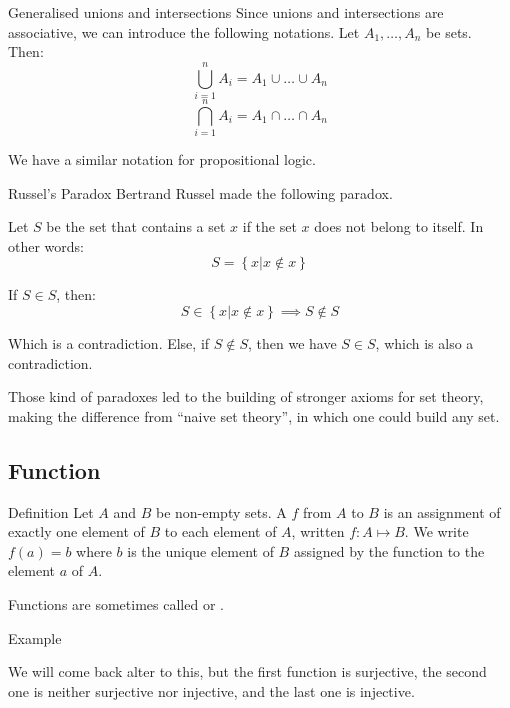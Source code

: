 \documentclass[a4paper]{article}
\begin{document}
\begin{parag}{Generalised unions and intersections}
    Since unions and intersections are associative, we can introduce the following notations. Let $A_1, \ldots, A_n$ be sets. Then:
    \[\bigcup_{i = 1}^{n} A_i = A_1 \cup \ldots \cup A_n\]
    \[\bigcap_{i = 1}^{n} A_i = A_1 \cap \ldots \cap A_n\]

    We have a similar notation for propositional logic.
\end{parag}

\begin{parag}{Russel's Paradox}
    Bertrand Russel made the following paradox.

    Let $S$ be the set that contains a set $x$ if the set $x$ does not belong to itself. In other words:
    \[S = \left\{x | x \not \in x\right\}\]

    If $S \in S$, then:
    \[S \in \left\{x |x \not \in x\right\} \implies S \not \in S\]

    Which is a contradiction. Else, if $S \not \in S$, then we have $S \in S$, which is also a contradiction.

    Those kind of paradoxes led to the building of stronger axioms for set theory, making the difference from ``naive set theory'', in which one could build any set.
\end{parag}

\subsection{Function}
\begin{parag}{Definition}
    Let $A$ and $B$ be non-empty sets. A  $f$ from $A$ to $B$ is an assignment of exactly one element of $B$ to each element of $A$, written $f: A \mapsto B$. We write $f\left(a\right) = b$ where $b$ is the unique element of $B$ assigned by the function to the element $a$ of $A$.

    Functions are sometimes called  or .

    \begin{subparag}{Example}

        We will come back alter to this, but the first function is surjective, the second one is neither surjective nor injective, and the last one is injective.
    \end{subparag}
\end{parag}
\end{document}
